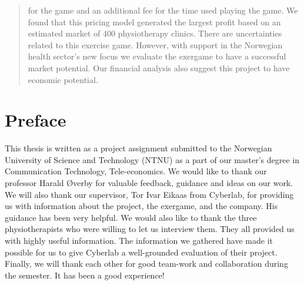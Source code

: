\documentclass[b5paper,twoside,openright,11pt]{report}
\begin{document}
\begin{abstract}
for the game and an additional fee for the time used playing the game. We found that this pricing model generated the largest profit based on an estimated market of 400 physiotherapy clinics. There are uncertainties related to this exercise game. However, with support in the Norwegian health sector's new focus we evaluate the exergame to have a successful market potential. Our financial analysis also suggest this project to have economic potential. 
\end{abstract}
\cleardoublepage
\chapter*{Preface}
This thesis is written as a project assignment submitted to the Norwegian University of Science and Technology (NTNU) as a part of our master's degree in Communication Technology, Tele-economics. 
We would like to thank our professor Harald Øverby for valuable feedback, guidance and ideas on our work. We will also thank our supervisor, Tor Ivar Eikaas from Cyberlab, for providing us with information about the project, the exergame, and the company. His guidance has been very helpful. We would also like to thank the three physiotherapists who were willing to let us interview them. They all provided us with highly useful information. The information we gathered have made it possible for us to give Cyberlab a well-grounded evaluation of their project.  
Finally, we will thank each other for good team-work and collaboration during the semester. It has been a good experience! 

\cleardoublepage
{}
\tableofcontents
\cleardoublepage

\cleardoublepage
\listoffigures
\cleardoublepage
\listoftables
\cleardoublepage
{}
\pagestyle{fancy}
\fancyhead[LE]{\thepage}
\fancyhead[RE]{\leftmark}
\fancyhead[RO]{\thepage}
\fancyhead[LO]{\rightmark}
\fancyfoot{}

\cleardoublepage

\cleardoublepage

\cleardoublepage

\cleardoublepage

\cleardoublepage

\cleardoublepage

\cleardoublepage

\cleardoublepage

\cleardoublepage

\cleardoublepage


\cleardoublepage

\end{document}
